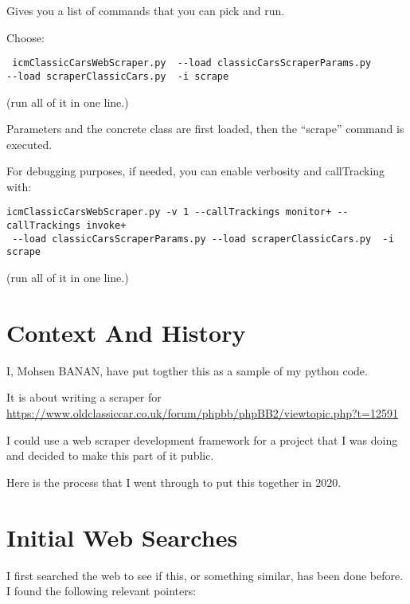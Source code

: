 \documentclass{article}
\begin{document}
\begin{description}
        Gives you a list of commands that you can pick and run.

        Choose:
\begin{verbatim}
 icmClassicCarsWebScraper.py  --load classicCarsScraperParams.py
--load scraperClassicCars.py  -i scrape
\end{verbatim}

        (run all of it in one line.)


        Parameters and the concrete class are first loaded, then the ``scrape'' command is executed.

        For debugging purposes, if needed, you can enable verbosity and callTracking with:

\begin{verbatim}
icmClassicCarsWebScraper.py -v 1 --callTrackings monitor+ --callTrackings invoke+
 --load classicCarsScraperParams.py --load scraperClassicCars.py  -i scrape
\end{verbatim}

        (run all of it in one line.)

\end{description}



\bigskip

\section{Context And History}

I, Mohsen BANAN, have put togther this as a sample of my python code.

It is about writing a scraper for\\
\url{https://www.oldclassiccar.co.uk/forum/phpbb/phpBB2/viewtopic.php?t=12591}

I could use a web scraper development framework for a project
that I was doing and decided to make this part of it public.

Here is the process that I went through to put this together in 2020.


\section{Initial Web Searches}

I first searched the web to see if this, or something similar, has been done before.
I found the following relevant pointers:
\end{document}
